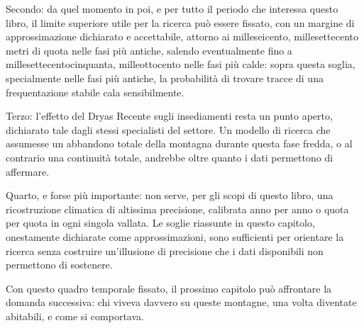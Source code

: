 Secondo: da quel momento in poi, e per tutto il periodo che interessa questo libro, il limite superiore utile per la ricerca può essere fissato, con un margine di approssimazione dichiarato e accettabile, attorno ai milleseicento, millesettecento metri di quota nelle fasi più antiche, salendo eventualmente fino a millesettecentocinquanta, milleottocento nelle fasi più calde: sopra questa soglia, specialmente nelle fasi più antiche, la probabilità di trovare tracce di una frequentazione stabile cala sensibilmente.

Terzo: l'effetto del Dryas Recente sugli insediamenti resta un punto aperto, dichiarato tale dagli stessi specialisti del settore. Un modello di ricerca che assumesse un abbandono totale della montagna durante questa fase fredda, o al contrario una continuità totale, andrebbe oltre quanto i dati permettono di affermare.

Quarto, e forse più importante: non serve, per gli scopi di questo libro, una ricostruzione climatica di altissima precisione, calibrata anno per anno o quota per quota in ogni singola vallata. Le soglie riassunte in questo capitolo, onestamente dichiarate come approssimazioni, sono sufficienti per orientare la ricerca senza costruire un'illusione di precisione che i dati disponibili non permettono di sostenere.

Con questo quadro temporale fissato, il prossimo capitolo può affrontare la domanda successiva: chi viveva davvero su queste montagne, una volta diventate abitabili, e come si comportava.
